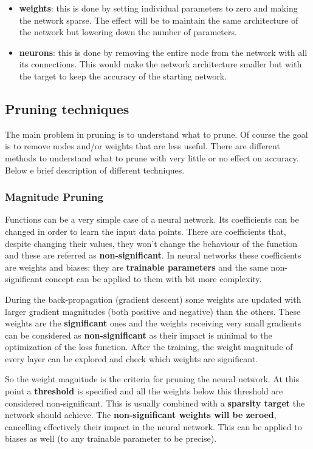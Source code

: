 \begin{itemize}
    \item \textbf{weights}: this is done by setting individual parameters to
        zero and making the network sparse. The effect will be to maintain the
        same architecture of the network but lowering down the number of
        parameters.
    \item \textbf{neurons}: this is done by removing the entire node from the
        network with all its connections. This would make the network
        architecture smaller but with the target to keep the accuracy of the
        starting network.
\end{itemize}

\subsection{Pruning techniques}
The main problem in pruning is to understand what to prune. Of course the goal
is to remove nodes and/or weights that are less useful. There are different
methods to understand what to prune with very little or no effect on accuracy.
Below e brief description of different techniques.

\subsubsection{Magnitude Pruning}
Functions can be a very simple case of a neural network. Its coefficients can
be changed in order to learn the input data points. There are coefficients
that, despite changing their values, they won't change the behaviour of the
function and these are referred as \textbf{non-significant}.
In neural networks these coefficients are weights and biases: they are
\textbf{trainable parameters} and the same non-significant concept can be
applied to them with bit more complexity.

During the back-propagation (gradient descent) some weights are updated with
larger gradient magnitudes (both positive and negative) than the others.
These weights are the \textbf{significant} ones and the weights receiving very
small gradients can be considered as \textbf{non-significant} as their impact
is minimal to the optimization of the loss function.
After the training, the weight magnitude of every layer can be explored and
check which weights are significant.

So the weight magnitude is the criteria for pruning the neural network.
At this point a \textbf{threshold} is specified and all the weights below this
threshold are considered non-significant. This is usually combined with a
\textbf{sparsity target} the network should achieve.
The \textbf{non-significant weights will be zeroed}, cancelling effectively
their impact in the neural network.
This can be applied to biases as well (to any trainable parameter to be
precise).

